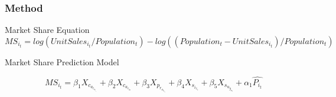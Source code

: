 \documentclass{beamer}
\begin{document}
\begin{frame}
\frametitle{Method}

Market Share Equation
\begin{displaymath}

MS_i_t=log(Unit Sales_i_t/Population_t) - log((Population_t - Unit Sales_i_t)/Population_t)

\end{displaymath}

Market Share Prediction Model

\begin{displaymath}

MS_i_t=\beta_1X_c_a_l_o_r_i_e_s + \beta_2X_c_a_r_b_s + \beta_3X_p_r_o_t_e_i_n +
\beta_4X_s_i_z_e + \beta_5X_s_u_g_a_r + \alpha_1\widehat{P_i_t}

\end{displaymath}

\end{frame}
\end{document}
